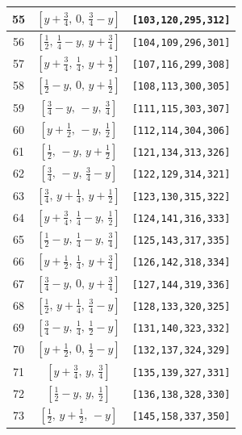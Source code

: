 \documentclass[fleqn,8pt]{jsarticle}
\begin{document}
\begin{longtable}{ccc}
55 & $\left[ y + \frac{3}{4},\, 0,\, \frac{3}{4} - y \right]$ & {\tt [103,120,295,312]} \\ \hline
56 & $\left[ \frac{1}{2},\, \frac{1}{4} - y,\, y + \frac{3}{4} \right]$ & {\tt [104,109,296,301]} \\ \hline
57 & $\left[ y + \frac{3}{4},\, \frac{1}{4},\, y + \frac{1}{2} \right]$ & {\tt [107,116,299,308]} \\ \hline
58 & $\left[ \frac{1}{2} - y,\, 0,\, y + \frac{1}{2} \right]$ & {\tt [108,113,300,305]} \\ \hline
59 & $\left[ \frac{3}{4} - y,\, - y,\, \frac{3}{4} \right]$ & {\tt [111,115,303,307]} \\ \hline
60 & $\left[ y + \frac{1}{2},\, - y,\, \frac{1}{2} \right]$ & {\tt [112,114,304,306]} \\ \hline
61 & $\left[ \frac{1}{2},\, - y,\, y + \frac{1}{2} \right]$ & {\tt [121,134,313,326]} \\ \hline
62 & $\left[ \frac{3}{4},\, - y,\, \frac{3}{4} - y \right]$ & {\tt [122,129,314,321]} \\ \hline
63 & $\left[ \frac{3}{4},\, y + \frac{1}{4},\, y + \frac{1}{2} \right]$ & {\tt [123,130,315,322]} \\ \hline
64 & $\left[ y + \frac{3}{4},\, \frac{1}{4} - y,\, \frac{1}{2} \right]$ & {\tt [124,141,316,333]} \\ \hline
65 & $\left[ \frac{1}{2} - y,\, \frac{1}{4} - y,\, \frac{3}{4} \right]$ & {\tt [125,143,317,335]} \\ \hline
66 & $\left[ y + \frac{1}{2},\, \frac{1}{4},\, y + \frac{3}{4} \right]$ & {\tt [126,142,318,334]} \\ \hline
67 & $\left[ \frac{3}{4} - y,\, 0,\, y + \frac{3}{4} \right]$ & {\tt [127,144,319,336]} \\ \hline
68 & $\left[ \frac{1}{2},\, y + \frac{1}{4},\, \frac{3}{4} - y \right]$ & {\tt [128,133,320,325]} \\ \hline
69 & $\left[ \frac{3}{4} - y,\, \frac{1}{4},\, \frac{1}{2} - y \right]$ & {\tt [131,140,323,332]} \\ \hline
70 & $\left[ y + \frac{1}{2},\, 0,\, \frac{1}{2} - y \right]$ & {\tt [132,137,324,329]} \\ \hline
71 & $\left[ y + \frac{3}{4},\, y,\, \frac{3}{4} \right]$ & {\tt [135,139,327,331]} \\ \hline
72 & $\left[ \frac{1}{2} - y,\, y,\, \frac{1}{2} \right]$ & {\tt [136,138,328,330]} \\ \hline
73 & $\left[ \frac{1}{2},\, y + \frac{1}{2},\, - y \right]$ & {\tt [145,158,337,350]} \\ \hline

\end{longtable}
\end{document}
